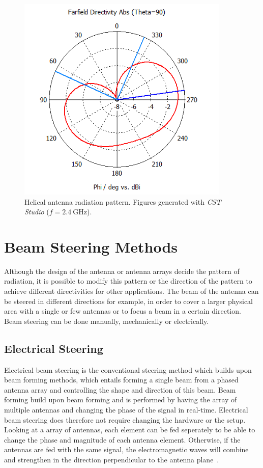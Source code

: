 \begin{figure}[H]
\begin{minipage}{0.45\textwidth}
        \includegraphics[width=0.9\textwidth]{figures/farfield (f=2.4) helical_1.png} %
    \end{minipage}
    \caption{Helical antenna radiation pattern. Figures generated with \textit{CST Studio} ($f=\SI{2.4}{\giga\hertz}$).}
    \label{fig:helical_1}
\end{figure}

\section{Beam Steering Methods}
Although the design of the antenna or antenna arrays decide the pattern of radiation, it is possible to modify this pattern or the direction of the pattern to achieve different directivities for other applications. The beam of the antenna can be steered in different directions for example, in order to cover a larger physical area with a single or few antennas or to focus a beam in a certain direction. Beam steering can be done manually, mechanically or electrically.

\subsection{Electrical Steering}
Electrical beam steering is the conventional steering method which builds upon beam forming methods, which entails forming a single beam from a phased antenna array and controlling the shape and direction of this beam. Beam forming build upon beam forming and is performed by having the array of multiple antennas and changing the phase of the signal in real-time. Electrical beam steering does therefore not require changing the hardware or the setup. Looking at a array of antennas, each element can be fed seperately to be able to change the phase and magnitude of each antenna element. Otherwise, if the antennas are fed with the same signal, the electromagnetic waves will combine and strengthen in the direction perpendicular to the antenna plane~\cite{beamsteering}.


